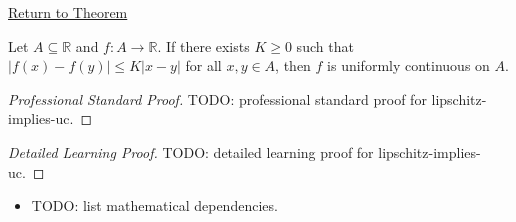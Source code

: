 \newpage
{}
\label{prf:lipschitz-implies-uc}

\begin{remark*}[Return]
\hyperref[prop:lipschitz-implies-uc]{Return to Theorem}
\end{remark*}

\begin{theorem*}
Let $A \subseteq \mathbb{R}$ and $f:A \to \mathbb{R}$. If there exists $K \ge 0$ such that $|f(x)-f(y)| \le K |x-y|$ for all $x,y \in A$, then $f$ is uniformly continuous on $A$.
\end{theorem*}

\begin{proof}[Professional Standard Proof]
\LRAProofBodyStart
TODO: professional standard proof for lipschitz-implies-uc.
\end{proof}

\begin{proof}[Detailed Learning Proof]
\LRAProofBodyStart
TODO: detailed learning proof for lipschitz-implies-uc.
\end{proof}

\begin{remark*}
\end{remark*}

\begin{dependencies}
\begin{itemize}
  \item TODO: list mathematical dependencies.
\end{itemize}
\end{dependencies}

\clearpage
